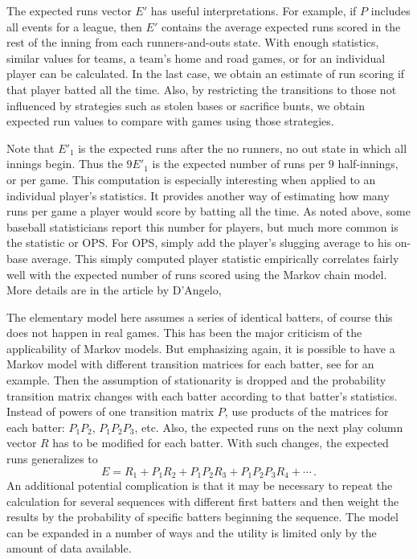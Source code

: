 \documentclass[12pt]{article}
\begin{document}
The expected runs vector \( E' \) has useful interpretations.  For
example, if \( P \) includes all events for a league, then \( E' \)
contains the average expected runs scored in the rest of the inning from
each runners-and-outs state.  With enough statistics, similar values for
teams, a team's home and road games, or for an individual player can be
calculated.  In the last case, we obtain an estimate of run scoring if
that player batted all the time.  Also, by restricting the transitions
to those not influenced by strategies such as stolen bases or sacrifice
bunts, we obtain expected run values to compare with games using those
strategies.

Note that \( E'_1 \) is the expected runs after the no runners, no out
state in which all innings begin.  Thus the  \( 9E'_1 \)
is the expected number of runs per \( 9 \) half-innings, or per game.
This computation is especially interesting when applied to an individual
player's statistics.  It provides another way of estimating how many
runs per game a player would score by batting all the time.  As noted
above, some baseball statisticians report this number for players, but
much more common is the  statistic or OPS\@.
For OPS, simply add the player’s slugging average to his on-base
average. This simply computed player statistic empirically correlates
fairly well with the expected number of runs scored using the Markov
chain model. More details are in the article by D'Angelo,%
\cite{dangelo10}

The elementary model here assumes a series of identical batters, of
course this does not happen in real games. This has been the major
criticism of the applicability of Markov models. But emphasizing again,
it is possible to have a Markov model with different transition matrices
for each batter, see \cite{osbourne20} for an example.
Then the assumption of stationarity is dropped and the
probability transition matrix changes with each batter according to that
batter's statistics.  Instead of powers of one transition matrix \( P \),
use products of the matrices for each batter:  \( P_1 P_2 \), \( P_1 P_2
P_3 \), etc.  Also, the expected runs on the next play column vector \(
R \) has to be modified for each batter.  With such changes, the
expected runs generalizes to
\[
    E = R_{1} + P_1 R_2 + P_1 P_2 R_3 + P_1 P_2 P_3 R_4 + \cdots\,.
\] An additional potential complication is that it may be necessary to
repeat the calculation for several sequences with different first
batters and then weight the results by the probability of specific
batters beginning the sequence.  The model can be expanded in a number
of ways and the utility is limited only by the amount of data available.
\end{document}
